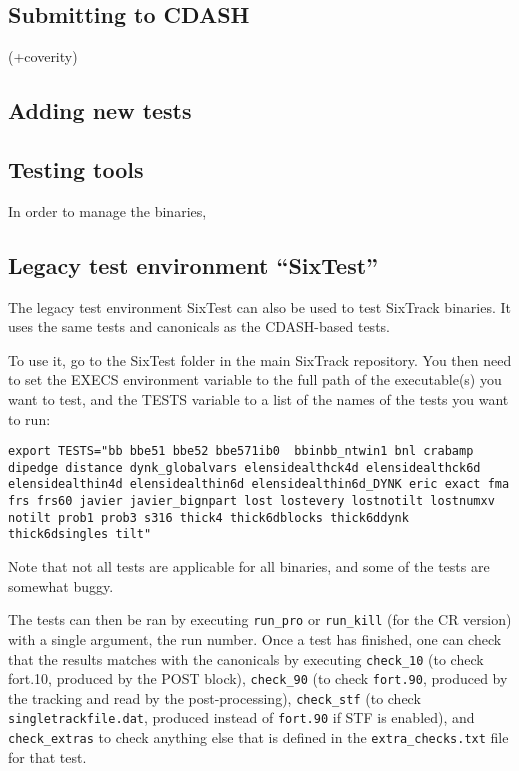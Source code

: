 \documentclass[english,BCOR=0mm,DIV=18]{scrartcl}
\begin{document}
\subsection{Submitting to CDASH}

(+coverity)

\subsection{Adding new tests}

\subsection{Testing tools}
In order to manage the binaries, 

\subsection{Legacy test environment ``SixTest''}

The legacy test environment SixTest can also be used to test SixTrack binaries.
It uses the same tests and canonicals as the CDASH-based tests.

To use it, go to the SixTest folder in the main SixTrack repository.
You then need to set the EXECS environment variable to the full path of the executable(s) you want to test, and the TESTS variable to a list of the names of the tests you want to run:
\begin{lstlisting}
export TESTS="bb bbe51 bbe52 bbe571ib0  bbinbb_ntwin1 bnl crabamp dipedge distance dynk_globalvars elensidealthck4d elensidealthck6d elensidealthin4d elensidealthin6d elensidealthin6d_DYNK eric exact fma frs frs60 javier javier_bignpart lost lostevery lostnotilt lostnumxv notilt prob1 prob3 s316 thick4 thick6dblocks thick6ddynk thick6dsingles tilt"
\end{lstlisting}
Note that not all tests are applicable for all binaries, and some of the tests are somewhat buggy.

The tests can then be ran by executing \texttt{run\_pro} or \texttt{run\_kill} (for the CR version) with a single argument, the run number.
Once a test has finished, one can check that the results matches with the canonicals by executing \texttt{check\_10} (to check fort.10, produced by the POST block), \texttt{check\_90} (to check \texttt{fort.90}, produced by the tracking and read by the post-processing), \texttt{check\_stf} (to check \texttt{singletrackfile.dat}, produced instead of \texttt{fort.90} if STF is enabled), and \texttt{check\_extras} to check anything else that is defined in the \texttt{extra\_checks.txt} file for that test.
\end{document}
